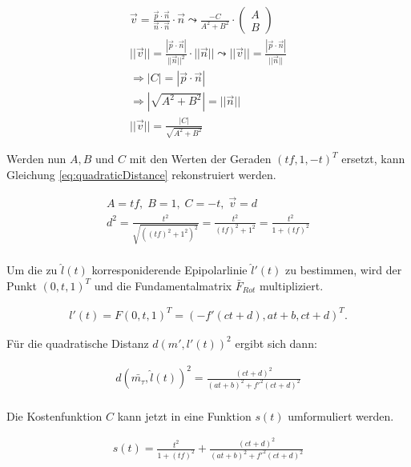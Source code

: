 \begin{gather}
	\vec{v} = \frac{\vec{p} \cdot \vec{n}}{\vec{n} \cdot \vec{n}} \cdot \vec{n}
	\leadsto \frac{-C}{A^2+B^2} \cdot \begin{pmatrix}
	A\\B
	\end{pmatrix}\\
	||\vec{v}|| = \frac{|\vec{p} \cdot \vec{n}|}{||\vec{n}||^2} \cdot ||\vec{n}|| \leadsto ||\vec{v}|| = \frac{|\vec{p} \cdot \vec{n}|}{||\vec{n}||}\\
	\Rightarrow |C| = |\vec{p} \cdot \vec{n}| \\
	\Rightarrow |\sqrt{A^2+B^2}| = ||\vec{n}||\\
	||\vec{v}|| = \frac{|C|}{\sqrt{A^2+B^2}}
\end{gather}

Werden nun $A,B$ und $C$ mit den Werten der Geraden $(tf,1,-t)^T$ ersetzt, kann Gleichung \ref{eq:quadraticDistance} rekonstruiert werden.

\begin{gather}
	A = tf, \; B= 1, \; C = -t, \; \vec{v} = d\\
	d^2 = \frac{t^2}{\sqrt{((tf)^2+1^2)^2}} = \frac{t^2}{(tf)^2+ 1^2} =  \frac{t^2}{1 + (tf)^2}
\end{gather}\\

Um die zu $\hat{l}(t)$ korresponiderende Epipolarlinie $\hat{l}'(t)$ zu bestimmen, wird der Punkt $(0,t,1)^T$ und die Fundamentalmatrix $\bar{F}_{Rot}$ multipliziert.

\begin{gather}
	l'(t) = F(0,t,1)^T = (-f'(ct+d),at+b,ct+d)^T.
\end{gather}

Für die quadratische Distanz $d(m',l'(t))^2$ ergibt sich dann:

\begin{gather}
	d(\bar{m_\tau},\hat{l}(t))^2 = \frac{(ct + d)^2}{(at+b)^2+f'^2(ct+d)^2}
\end{gather} \\

Die Kostenfunktion $C$ kann jetzt in eine Funktion $s(t)$ umformuliert werden.

\begin{gather}
	s(t) = \frac{t^2}{1+(tf)^2} + \frac{(ct + d)^2}{(at+b)^2+f'^2(ct+d)^2}
\end{gather}

